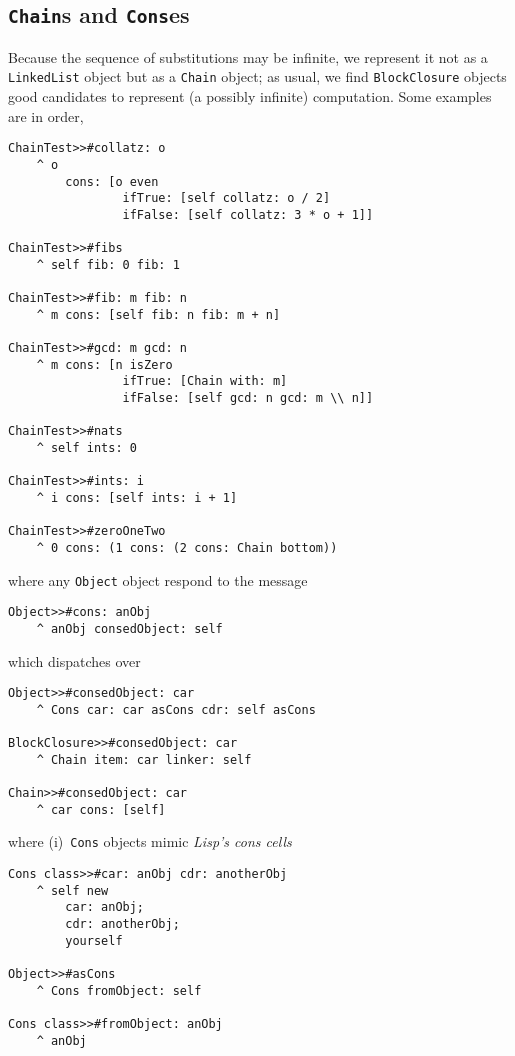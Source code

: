 \documentclass[a4paper,12pt]{article}
\begin{document}
\subsection{\texttt{Chain}s and \texttt{Cons}es}

Because the sequence of substitutions may be infinite, we
represent it not as a \Verb|LinkedList| object but as a \Verb|Chain| object;
as usual, we find \Verb|BlockClosure| objects good candidates to represent (a possibly
infinite) computation. Some examples are in order,
\begin{verbatim}
ChainTest>>#collatz: o
    ^ o
        cons: [o even
                ifTrue: [self collatz: o / 2]
                ifFalse: [self collatz: 3 * o + 1]]

ChainTest>>#fibs
    ^ self fib: 0 fib: 1

ChainTest>>#fib: m fib: n
    ^ m cons: [self fib: n fib: m + n]

ChainTest>>#gcd: m gcd: n
    ^ m cons: [n isZero
                ifTrue: [Chain with: m]
                ifFalse: [self gcd: n gcd: m \\ n]]

ChainTest>>#nats
    ^ self ints: 0

ChainTest>>#ints: i
    ^ i cons: [self ints: i + 1]

ChainTest>>#zeroOneTwo
    ^ 0 cons: (1 cons: (2 cons: Chain bottom))
\end{verbatim}
where any \Verb|Object| object respond to the message
\begin{verbatim}
Object>>#cons: anObj
    ^ anObj consedObject: self
\end{verbatim}
which dispatches over
\begin{verbatim}
Object>>#consedObject: car
    ^ Cons car: car asCons cdr: self asCons

BlockClosure>>#consedObject: car
    ^ Chain item: car linker: self

Chain>>#consedObject: car
    ^ car cons: [self]
\end{verbatim}
where (i)~\Verb|Cons| objects mimic \textit{Lisp's cons cells}
\begin{verbatim}
Cons class>>#car: anObj cdr: anotherObj 
    ^ self new 
        car: anObj;
        cdr: anotherObj;
        yourself

Object>>#asCons
    ^ Cons fromObject: self

Cons class>>#fromObject: anObj 
    ^ anObj
\end{verbatim}
\end{document}

